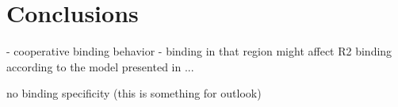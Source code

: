 \chapter{Conclusions}


- cooperative binding behavior
- binding in that region might affect R2 binding according to the model
    presented in ...

    no binding specificity (this is something for outlook)